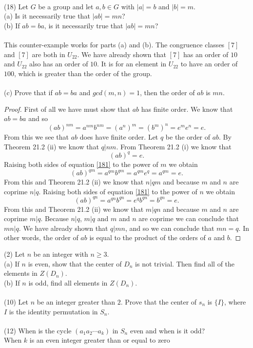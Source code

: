 \documentclass[11pt,a4paper]{article}
\begin{document}
~\\
(18) Let $G$ be a group and let $a,b\in G$ with $|a| = b$ and $|b| = m$.\\
(a) Is it necessarily true that $|ab| = mn$?\\
(b) If $ab = ba$, is it necessarily true that $|ab| = mn$?\\
~\\
This counter-example works for parts (a) and (b). The congruence classes $[7]$ and $[7]$ are both in $U_{22}$. We have already shown that $[7]$ has an order of $10$ and $U_{22}$ also has an order of $10$. It is for an element in $U_{22}$ to have an order of $100$, which is greater than the order of the group.\\
~\\
(c) Prove that if $ab = ba$ and $gcd(m,n) = 1$, then the order of $ab$ is $mn$.

\begin{proof}
First of all we have must show that $ab$ has finite order. We know that $ab = ba$ and so
\[(ab)^{nm} = a^{nm}b^{nm} = (a^n)^m = (b^m)^n = e^m e^n = e.\]
From this we see that $ab$ does have finite order. Let $q$ be the order of $ab$. By Theorem 21.2 (ii) we know that $q | nm$. From Theorem 21.2 (i) we know that
\begin{equation}\label{181}
(ab)^q = e.
\end{equation}
Raising both sides of equation \eqref{181} to the power of $m$ we obtain
\[(ab)^{qm} = a^{qm} b^{qm} = a^{qm} e^q = a^{qm} = e.\]
From this and Theorem 21.2 (ii) we know that $n | qm$ and because $m$ and $n$ are coprime $n | q$.
Raising both sides of equation \eqref{181} to the power of $n$ we obtain
\[(ab)^{qn} = a^{qn} b^{qn} = e^q b^{qn} = b^{qn} = e.\]
From this and Theorem 21.2 (ii) we know that $m | qn$ and because $m$ and $n$ are coprime $m | q$.
Because $n | q$, $m | q$ and $m$ and $n$ are coprime we can conclude that $mn | q$. We have already shown that $q | mn$, and so we can conclude that $mn = q$. In other words, the order of $ab$ is equal to the product of the orders of $a$ and $b$.
\end{proof}

(2) Let $n$ be an integer with $n \geq 3$.\\
(a) If $n$ is even, show that the center of $D_n$ is not trivial. Then find all of the elements in $Z(D_n)$.\\
(b) If $n$ is odd, find all elements in $Z(D_n)$.\\
~\\
(10) Let $n$ be an integer greater than $2$. Prove that the center of $s_n$ is $\{I \}$, where $I$ is the identity permutation in $S_n$.\\
~\\
(12) When is the cycle $(a_1 a_2 \cdots a_k)$ in $S_n$ even and when is it odd?\\
When $k$ is an even integer greater than or equal to zero 
\end{document}
